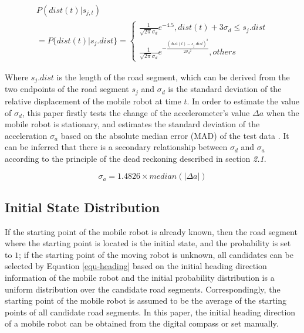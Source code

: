 \documentclass{llncs}
\begin{document}
\begin{equation}
\label{equ-obv-dist}
\begin{array}{l}
P(dist(t)|{s_{j,t}})\\
= P\{ dist(t)|{s_j}.dist\}  = \left\{ {\begin{array}{*{20}{l}}
	{\frac{1}{{\sqrt {2\pi } {\sigma _d}}}{e^{ - 4.5}},dist(t) + 3{\sigma _d} \le {s_j}.dist}\\
	{\frac{1}{{\sqrt {2\pi } {\sigma _d}}}{e^{ - \frac{{{{(dist(t) - {s_j}.dist)}^2}}}{{2{\sigma _d}^2}}}},others}
	\end{array}} \right.
\end{array}
\end{equation}

Where ${s_j}.dist$ is the length of the road segment, which can be derived from the two endpoints of the road segment $s_j$ and $\sigma _d$ is the standard deviation of the relative displacement of the mobile robot at time $t$. In order to estimate the value of $\sigma _d$, this paper firstly tests the change of the accelerometer's value $\Delta a$ when the mobile robot is stationary, and estimates the standard deviation of the acceleration $\sigma_a$ based on the absolute median error (MAD) of the test data \cite{aly2015semmatch}. It can be inferred that there is a secondary relationship between $\sigma _d$ and $\sigma _a$ according to the principle of the dead reckoning described in section \emph{2.1}.

\begin{equation}
	{\sigma _a} = 1.4826 \times median(\left| {\Delta a} \right|)
\end{equation}

\subsection{Initial State Distribution}

If the starting point of the mobile robot is already known, then the road segment where the starting point is located is the initial state, and the probability is set to $1$; if the starting point of the moving robot is unknown, all candidates can be selected by Equation \ref{equ-heading} based on the initial heading direction information of the mobile robot and the initial probability distribution is a uniform distribution over the candidate road segments. Correspondingly, the starting point of the mobile robot is assumed to be the average of the starting points of all candidate road segments. In this paper, the initial heading direction of a mobile robot can be obtained from the digital compass or set manually.
\end{document}
